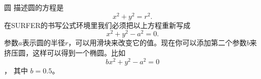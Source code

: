 ﻿\begin{surferPage}{圆}
描述圆的方程是
\[x^2+y^2=r^2.\]
在SURFER的书写公式环境里我们必须把以上方程重新写成
\[x^2+y^2-a^2=0.\]
参数$a$表示圆的半径$r$，可以用滑块来改变它的值。现在你可以添加第二个参数$b$来挤压圆，这样可以得到一个椭圆。比如
\[bx^2+y^2-a^2=0\]， 其中 $b=0.5$。
\end{surferPage}
